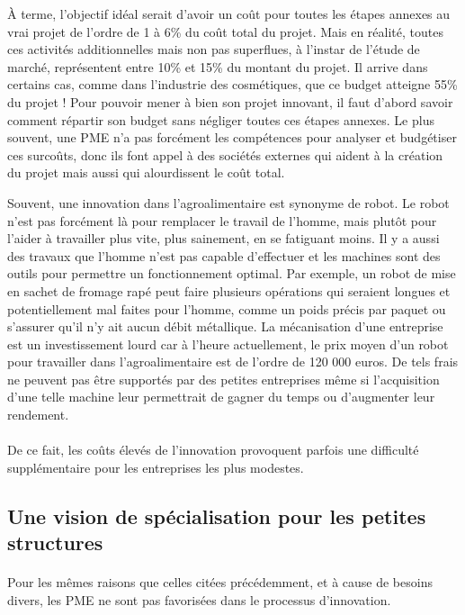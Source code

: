 \documentclass[a4paper,12pt]{report}
\begin{document}
		À terme, l’objectif idéal serait d’avoir un coût pour toutes les étapes annexes au vrai projet de l’ordre de 1 à 6\% du coût total du projet. Mais en réalité, toutes ces activités additionnelles mais non pas superflues, à l'instar de l’étude de marché, représentent entre 10\% et 15\% du montant du projet. Il arrive dans certains cas, comme dans l’industrie des cosmétiques, que ce budget atteigne 55\% du projet ! Pour pouvoir mener à bien son projet innovant, il faut d’abord savoir comment répartir son budget sans négliger toutes ces étapes annexes. Le plus souvent, une PME n’a pas forcément les compétences pour analyser et budgétiser ces surcoûts, donc ils font appel à des sociétés externes qui aident à la création du projet mais aussi qui alourdissent le coût total.
		
		Souvent, une innovation dans l'agroalimentaire est synonyme de robot. Le robot n'est pas forcément là pour remplacer le travail de l'homme, mais plutôt pour l'aider à travailler plus vite, plus sainement, en se fatiguant moins. Il y a aussi des travaux que l'homme n'est pas capable d'effectuer et les machines sont des outils pour permettre un fonctionnement optimal. Par exemple, un robot de mise en sachet de fromage rapé peut faire plusieurs opérations qui seraient longues et potentiellement mal faites pour l'homme, comme un poids précis par paquet ou s'assurer qu'il n'y ait aucun débit métallique. La mécanisation d'une entreprise est un investissement lourd car à l'heure actuellement, le prix moyen d'un robot pour travailler dans l'agroalimentaire est de l'ordre de 120 000 euros\cite{LesRobots}. De tels frais ne peuvent pas être supportés par des petites entreprises même si l'acquisition d'une telle machine leur permettrait de gagner du temps ou d'augmenter leur rendement.
		
		\paragraph{}De ce fait, les coûts élevés de l'innovation provoquent parfois une difficulté supplémentaire pour les entreprises les plus modestes.
				
		\subsection{Une vision de spécialisation pour les petites structures}
		\paragraph{}Pour les mêmes raisons que celles citées précédemment, et à cause de besoins divers, les PME ne sont pas favorisées dans le processus d'innovation.
		
\end{document}
